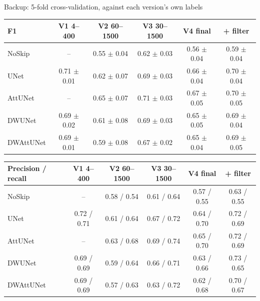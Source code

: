 \begin{frame}{Backup: 5-fold cross-validation, against each version's own labels}
  \centering\scriptsize
  \renewcommand{\arraystretch}{1.05}\setlength{\tabcolsep}{3.5pt}
\begin{tabular}{@{}lccccc@{}}
\toprule
\textbf{F1} & \textbf{V1 4--400} & \textbf{V2 60--1500} & \textbf{V3 30--1500} & \textbf{V4 final} & \textbf{+ filter} \\
\midrule
NoSkip & -- & 0.55 $\pm$ 0.04 & 0.62 $\pm$ 0.03 & 0.56 $\pm$ 0.04 & 0.59 $\pm$ 0.04 \\
UNet & 0.71 $\pm$ 0.01 & 0.62 $\pm$ 0.07 & 0.69 $\pm$ 0.03 & 0.66 $\pm$ 0.04 & 0.70 $\pm$ 0.04 \\
AttUNet & -- & 0.65 $\pm$ 0.07 & 0.71 $\pm$ 0.03 & 0.67 $\pm$ 0.05 & 0.70 $\pm$ 0.05 \\
DWUNet & 0.69 $\pm$ 0.02 & 0.61 $\pm$ 0.08 & 0.69 $\pm$ 0.03 & 0.65 $\pm$ 0.05 & 0.69 $\pm$ 0.04 \\
DWAttUNet & 0.69 $\pm$ 0.01 & 0.59 $\pm$ 0.08 & 0.67 $\pm$ 0.02 & 0.65 $\pm$ 0.04 & 0.69 $\pm$ 0.05 \\
\bottomrule
\end{tabular}

  \vspace{3mm}
\begin{tabular}{@{}lccccc@{}}
\toprule
\textbf{Precision / recall} & \textbf{V1 4--400} & \textbf{V2 60--1500} & \textbf{V3 30--1500} & \textbf{V4 final} & \textbf{+ filter} \\
\midrule
NoSkip & -- & 0.58 / 0.54 & 0.61 / 0.64 & 0.57 / 0.55 & 0.63 / 0.55 \\
UNet & 0.72 / 0.71 & 0.61 / 0.64 & 0.67 / 0.72 & 0.64 / 0.70 & 0.72 / 0.69 \\
AttUNet & -- & 0.63 / 0.68 & 0.69 / 0.74 & 0.65 / 0.70 & 0.72 / 0.69 \\
DWUNet & 0.69 / 0.69 & 0.59 / 0.64 & 0.66 / 0.71 & 0.63 / 0.66 & 0.73 / 0.65 \\
DWAttUNet & 0.69 / 0.69 & 0.57 / 0.63 & 0.63 / 0.72 & 0.62 / 0.68 & 0.70 / 0.67 \\
\bottomrule
\end{tabular}
  \vfill
\end{frame}


